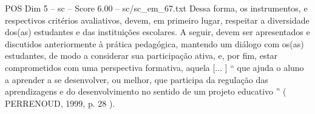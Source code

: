 \begin{textsample}{POS Dim 5 – sc – Score 6.00 – sc/sc\_em\_67.txt}
Dessa forma, os instrumentos, e respectivos critérios avaliativos, devem, em primeiro lugar, respeitar a diversidade dos(as) estudantes e das instituições escolares.
A seguir, devem ser apresentados e discutidos anteriormente à prática pedagógica, mantendo um diálogo com os(as) estudantes, de modo a considerar sua participação ativa, e, por fim, estar comprometidos com uma perspectiva formativa, aquela [... ] “ que ajuda o aluno a aprender a se desenvolver, ou melhor, que participa da regulação das aprendizagens e do desenvolvimento no sentido de um projeto educativo ” ( PERRENOUD, 1999, p. 28 ).

\end{textsample}
